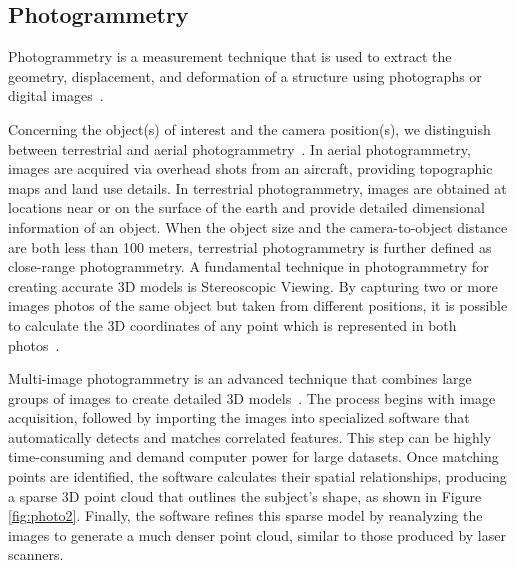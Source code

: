 \subsection{Photogrammetry}
\label{sec:photogrammetry}

Photogrammetry is a measurement technique that is used to extract the geometry, displacement, and deformation of a
structure using photographs or digital images~\cite{Baqersad2017Photogrammetry}.

Concerning the object(s) of interest and the camera position(s), we distinguish
between terrestrial and aerial photogrammetry~\cite{linder2016digital}.
In aerial photogrammetry, images are acquired via overhead shots from an aircraft, providing topographic maps and land use details. In terrestrial photogrammetry, images are obtained at locations near or on the surface of
the earth and provide detailed dimensional information of an object. When the object size and the camera-to-object 
distance are both less than 100 meters, terrestrial photogrammetry is further defined as close-range photogrammetry. A fundamental technique in photogrammetry for creating accurate \gls{3D} models is Stereoscopic Viewing. 
By capturing two or more images photos of the same object but taken from different positions, it is possible to calculate the \gls{3D} coordinates of any point which is represented in both photos~\cite{linder2016digital}. 

Multi-image photogrammetry is an advanced technique that combines large groups of images to create detailed \gls{3D} models~\cite{mccarthy2014multi}. The process begins with image acquisition, followed by importing 
the images into specialized software that automatically detects and matches correlated features. This step can be highly time-consuming and demand computer power for large datasets. 
Once matching points are identified, the software calculates their spatial relationships, producing a sparse \gls{3D} point cloud that outlines the subject’s shape, as shown in Figure \ref{fig:photo2}. 
Finally, the software refines this sparse model by reanalyzing the images to generate a much denser point cloud, similar to those produced by laser scanners.

